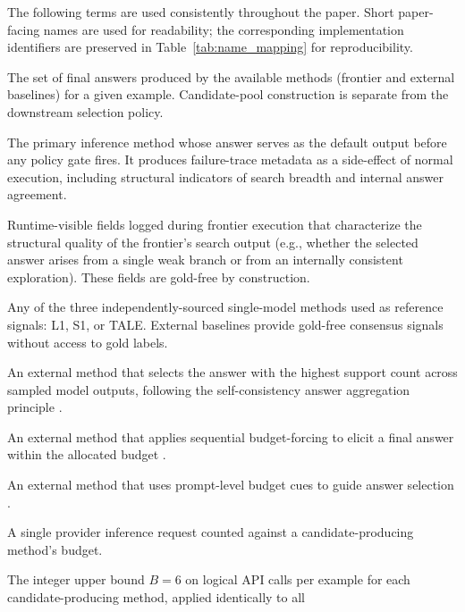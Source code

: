 \documentclass[smallcondensed]{svjour3}
\begin{document}
The following terms are used consistently throughout the paper.
Short paper-facing names are used for readability; the corresponding
implementation identifiers are preserved in Table~\ref{tab:name_mapping} for
reproducibility.

\begin{description}[leftmargin=2.2cm, labelwidth=2cm, labelsep=0.2cm, style=nextline]
  \item[Candidate pool] The set of final answers produced by the available
    methods (frontier and external baselines) for a given example.
    Candidate-pool construction is separate from the downstream selection
    policy.
  \item[Frontier method] The primary inference method whose answer serves as
    the default output before any policy gate fires.
    It produces failure-trace metadata as a side-effect of normal execution,
    including structural indicators of search breadth and internal answer
    agreement.
  \item[Failure-trace metadata] Runtime-visible fields logged during frontier
    execution that characterize the structural quality of the frontier's
    search output (e.g., whether the selected answer arises from a single weak
    branch or from an internally consistent exploration).
    These fields are gold-free by construction.
  \item[External baseline] Any of the three independently-sourced single-model
    methods used as reference signals: L1, S1, or TALE.
    External baselines provide gold-free consensus signals without access to
    gold labels.
  \item[L1] An external method that selects the answer with the highest support
    count across sampled model outputs, following the self-consistency answer
    aggregation principle \citep{wang2023selfconsistency}.
  \item[S1] An external method that applies sequential budget-forcing to elicit
    a final answer within the allocated budget \citep{muennighoff2025s1}.
  \item[TALE] An external method that uses prompt-level budget cues to guide
    answer selection \citep{han2025token}.
  \item[Logical API call] A single provider inference request counted against a
    candidate-producing method's budget.
  \item[Budget] The integer upper bound $B = 6$ on logical API calls per
    example for each candidate-producing method, applied identically to all

\end{description}
\end{document}
